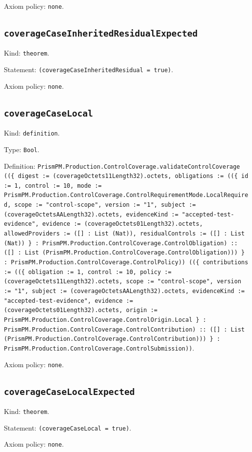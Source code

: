 \documentclass[11pt]{article}
\begin{document}
\noindent Axiom policy: \texttt{none}.\par
\subsection*{\texttt{coverageCaseInheritedResidualExpected}}
\noindent Kind: \texttt{theorem}.\par
\noindent Statement: \texttt{(coverageCaseInheritedResidual = true)}.\par
\noindent Axiom policy: \texttt{none}.\par
\subsection*{\texttt{coverageCaseLocal}}
\noindent Kind: \texttt{definition}.\par
\noindent Type: \texttt{Bool}.\par
\noindent Definition: \texttt{PrismPM.Production.ControlCoverage.validateControlCoverage ((\{ digest := (coverageOctets11Length32).octets, obligations := ((\{ id := 1, control := 10, mode := PrismPM.Production.ControlCoverage.ControlRequirementMode.LocalRequired, scope := "control-scope", version := "1", subject := (coverageOctetsAALength32).octets, evidenceKind := "accepted-test-evidence", evidence := (coverageOctets01Length32).octets, allowedProviders := ([] : List (Nat)), residualControls := ([] : List (Nat)) \} : PrismPM.Production.ControlCoverage.ControlObligation) :: ([] : List (PrismPM.Production.ControlCoverage.ControlObligation))) \} : PrismPM.Production.ControlCoverage.ControlPolicy)) ((\{ contributions := ((\{ obligation := 1, control := 10, policy := (coverageOctets11Length32).octets, scope := "control-scope", version := "1", subject := (coverageOctetsAALength32).octets, evidenceKind := "accepted-test-evidence", evidence := (coverageOctets01Length32).octets, origin := PrismPM.Production.ControlCoverage.ControlOrigin.Local \} : PrismPM.Production.ControlCoverage.ControlContribution) :: ([] : List (PrismPM.Production.ControlCoverage.ControlContribution))) \} : PrismPM.Production.ControlCoverage.ControlSubmission))}.\par
\noindent Axiom policy: \texttt{none}.\par
\subsection*{\texttt{coverageCaseLocalExpected}}
\noindent Kind: \texttt{theorem}.\par
\noindent Statement: \texttt{(coverageCaseLocal = true)}.\par
\noindent Axiom policy: \texttt{none}.\par
\end{document}
